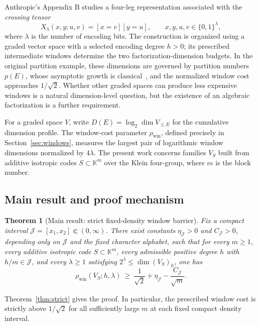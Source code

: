 \documentclass[10pt,a4paper]{article}
\numberwithin{equation}{section}
\newtheorem{theorem}{Theorem}[section]
\theoremstyle{remark}\newtheorem{remark}[theorem]{Remark}\newtheorem{question}[theorem]{Question}
\newcommand{\rhow}{\rho_{\mathrm{win}}}\newcommand{\F}{\mathbb F}\newcommand{\K}{\mathbb K}\newcommand{\Z}{\mathbb Z}\newcommand{\R}{\mathbb R}\newcommand{\cB}{\mathcal L}\newcommand{\wt}{\mathrm{wt}}\newcommand{\dimn}{\operatorname{dim}}\newcommand{\supp}{\operatorname{supp}}
\begin{document}
Anthropic's Appendix B studies a four-leg representation associated
with the \emph{crossing tensor}
\begin{equation}\label{eq:cross}
X_\lambda(x,y;u,v)=[x=v][y=u],\qquad
x,y,u,v\in\{0,1\}^\lambda,
\end{equation}
where $\lambda$ is the number of encoding bits. The construction is
organized using a graded vector space with a selected encoding degree
$h>0$; its prescribed intermediate windows determine the two
factorization-dimension budgets. In the original partition example,
these dimensions are governed by partition numbers $p(E)$, whose
asymptotic growth is classical~\cite{hardyramanujan}, and the normalized
window cost approaches $1/\sqrt2$. Whether other graded spaces can
produce less expensive windows is a natural dimension-level question,
but the existence of an algebraic factorization is a further requirement.

For a graded space $V$, write
$D(E)=\log_2\dimn V_{\le E}$ for the cumulative dimension profile.
The window-cost parameter $\rho_{\mathrm{win}}$, defined precisely in
Section~\ref{sec:windows}, measures the largest pair of logarithmic
window dimensions normalized by $4\lambda$. The present work concerns
families $V_S$ built from additive isotropic codes $S\subset\K^m$ over
the Klein four-group, where $m$ is the block number.

\subsection{Main result and proof mechanism}
\begin{theorem}[Main result: strict fixed-density window barrier]\label{thm:intro}
Fix a compact interval $\mathcal J=[x_1,x_2]\Subset(0,\infty)$.
There exist constants $\eta_{\mathcal J}>0$ and $C_{\mathcal J}>0$,
depending only on $\mathcal J$ and the fixed character alphabet,
such that for every $m\ge1$, every additive isotropic code
$S\subset\K^m$, every admissible positive degree $h$ with
$h/m\in\mathcal J$, and every $\lambda\ge1$ satisfying
$2^\lambda\le\dimn(V_S)_h$, one has
\begin{equation}\label{eq:intro-main}
\rhow(V_S;h,\lambda)\ \ge\
\frac1{\sqrt2}+\eta_{\mathcal J}-\frac{C_{\mathcal J}}{\sqrt m}.
\end{equation}
\end{theorem}
Theorem~\ref{thm:strict} gives the proof. In particular, the
prescribed window cost is strictly above $1/\sqrt2$ for all
sufficiently large $m$ at each fixed compact density interval.
\end{document}
